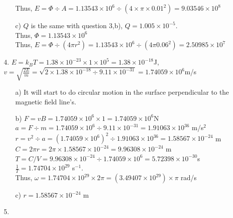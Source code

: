 \documentclass{article}
\begin{document}
\begin{itemize}
\begin{itemize}
    Thus, \(E = \Phi\div A = 1.13543 \times 10^{6} \div (4\times\pi\times0.01^2)=9.03546\times10^{8}\)
    \item [c)] \(Q\) is the same with question 3,b), \(Q = 1.005 \times 10^{-5}\).\\Thus, \(\Phi = 1.13543 \times 10^{6}\)
    \\Thus, \(E = \Phi\div (4\pi r^2 ) = 1.13543 \times 10^{6}\div(4\pi 0.06^2)=2.50985 \times 10^7\)
\end{itemize}
\newpage
\item[4.] \(E = k_BT = 1.38\times10^{-23}\times 1\times10^5 = 1.38\times10^{-18}\)J,\\
\(v = \sqrt{\frac{2E}{m}} = \sqrt{2\times1.38\times10^{-18}\div9.11\times10^{-31}}=1.74059\times 10^{6}\)m/s
\begin{itemize}
    \item [a)] It will start to do circular motion in the surface perpendicular to the magnetic field line's.
    \item [b)] \(F = vB = 1.74059\times 10^{6}\times 1 = 1.74059\times 10^{6}\)N\\
                \(a=F\div m = 1.74059\times 10^{6}\div 9.11\times 10^{-31} = 1.91063\times 10^{36}\) m/s\(^2\)
                \(r = v^2 \div a = (1.74059\times 10^{6})^2\div 1.91063\times 10^{36} = 1.58567\times 10^{-24}\) m
            \\  \(C = 2\pi r = 2\pi\times1.58567\times 10^{-24}=9.96308\times 10^{-24}\) m
            \\  \(T = C/V = 9.96308\times 10^{-24}\div1.74059\times 10^{6}=5.72398 \times 10^{-30}\)s 
            \\  \(\frac{1}{T}=1.74704\times 10^{29}\) s\(^{-1}\).
            \\  Thus, \(\omega = 1.74704\times 10^{29}\times 2\pi = (3.49407\times 10^{29})\times \pi\) rad/s
    \item [c)]\(r = 1.58567\times 10^{-24}\) m
\end{itemize}
\item[5.]
\end{itemize}
\end{document}
